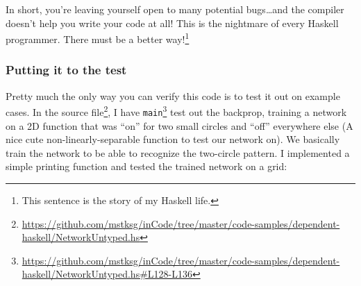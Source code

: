\documentclass[]{article}
\newenvironment{Shaded}{}{}
\newcommand{\AttributeTok}[1]{\textcolor[rgb]{0.49,0.56,0.16}{#1}}
\newcommand{\CommentTok}[1]{\textcolor[rgb]{0.38,0.63,0.69}{\textit{#1}}}
\newcommand{\ExtensionTok}[1]{#1}
\newcommand{\NormalTok}[1]{#1}
\renewcommand{\href}[2]{#2\footnote{\url{#1}}}
\begin{document}
In short, you're leaving yourself open to many potential bugs\ldots and the
compiler doesn't help you write your code at all! This is the nightmare of every
Haskell programmer. There must be a better way!\footnote{This sentence is the
  story of my Haskell life.}

\subsubsection{Putting it to the test}\label{putting-it-to-the-test}

Pretty much the only way you can verify this code is to test it out on example
cases. In the
\href{https://github.com/mstksg/inCode/tree/master/code-samples/dependent-haskell/NetworkUntyped.hs}{source
file}, I have
\href{https://github.com/mstksg/inCode/tree/master/code-samples/dependent-haskell/NetworkUntyped.hs\#L128-L136}{\texttt{main}}
test out the backprop, training a network on a 2D function that was ``on'' for
two small circles and ``off'' everywhere else (A nice cute
non-linearly-separable function to test our network on). We basically train the
network to be able to recognize the two-circle pattern. I implemented a simple
printing function and tested the trained network on a grid:

\begin{Shaded}
\end{Shaded}
\end{document}
